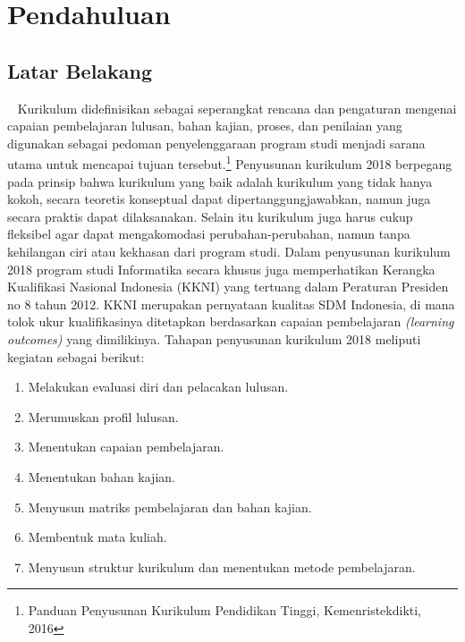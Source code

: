 \chapter{Pendahuluan}
\label{chap:Pendahuluan}
   
\section{Latar Belakang}
\label{sec:Latar Belakang}
~\cite{nasioanl:01:kurikulum}
Kurikulum didefinisikan sebagai seperangkat rencana dan pengaturan mengenai capaian pembelajaran 
lulusan, bahan kajian, proses, dan penilaian yang digunakan sebagai pedoman penyelenggaraan program studi menjadi sarana utama untuk mencapai tujuan tersebut.\footnote{Panduan Penyusunan Kurikulum Pendidikan Tinggi, Kemenristekdikti, 2016} Penyusunan kurikulum 2018 berpegang pada prinsip bahwa 
kurikulum yang baik adalah kurikulum yang tidak hanya kokoh, secara teoretis konseptual dapat dipertanggungjawabkan, namun juga secara praktis dapat dilaksanakan. Selain itu kurikulum juga harus cukup fleksibel agar dapat mengakomodasi perubahan-perubahan, namun tanpa kehilangan ciri atau kekhasan dari program studi. Dalam penyusunan kurikulum 2018 program studi Informatika secara khusus juga memperhatikan Kerangka Kualifikasi Nasional Indonesia (KKNI) yang tertuang dalam Peraturan Presiden no 8 tahun 2012. KKNI merupakan pernyataan kualitas SDM Indonesia, di mana tolok ukur kualifikasinya ditetapkan berdasarkan capaian 
pembelajaran \textit{(learning outcomes)} yang dimilikinya. Tahapan penyusunan kurikulum 2018 meliputi kegiatan sebagai berikut: 
\begin{enumerate}
\item Melakukan evaluasi diri dan pelacakan lulusan.
\item Merumuskan profil lulusan.
\item Menentukan capaian pembelajaran.
\item Menentukan bahan kajian.
\item Menyusun matriks pembelajaran dan bahan kajian.
\item Membentuk mata kuliah.
\item Menyusun struktur kurikulum dan menentukan metode pembelajaran.
\end{enumerate}

